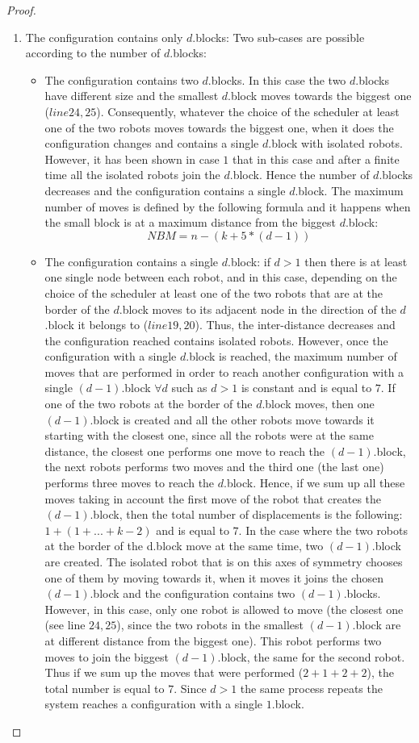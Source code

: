 \documentclass[12pt]{llncs}
\begin{document}
\begin{proof}
\begin{enumerate}
\item{The configuration contains only $d$.blocks:} Two sub-cases are possible according to the number of $d$.blocks:
\begin{itemize}
\item{The configuration contains two $d$.blocks.} In this case the two $d$.blocks have different size and the smallest $d$.block moves towards the biggest one ($line 24,25$). Consequently, whatever the choice of the scheduler at least one of the two robots moves towards the biggest one, when it does the configuration changes and contains a single $d$.block with isolated robots. However, it has been shown in case $1$ that in this case and after a finite time all the isolated robots join the $d$.block. Hence the number of $d$.blocks decreases and the configuration contains a single $d$.block. The maximum number of moves is defined by the following formula and it happens when the small block is at a maximum distance from the biggest $d$.block: \begin{equation}
    NBM= n-(k+5*(d-1))
   \label{max4}
 \end{equation}
\item{The configuration contains a single $d$.block:} if $d>1$ then there is at least one single node between each robot, and in this case, depending on the choice of the scheduler at least one of the two robots that are at the border of the $d$.block moves to its adjacent node in the direction of the $d$.block it belongs to ($line 19,20$). Thus, the inter-distance decreases and the configuration reached contains isolated robots. However, once the configuration with a single $d$.block is reached, the maximum number of moves that are performed in order to reach another configuration with a single $(d-1)$.block $\forall d$ such as $d>1$ is constant and is equal to $7$. If one of the two robots at the border of the $d$.block moves, then one $(d-1)$.block is created and all the other robots move towards it starting with the closest one, since all the robots were at the same distance, the closest one performs one move to reach the $(d-1)$.block, the next robots performs two moves and the third one (the last one) performs three moves to reach the $d$.block. Hence, if we sum up all these moves taking in account the first move of the robot that creates the $(d-1)$.block, then the total number of displacements is the following: $1+(1+...+ k-2)$ and is equal to $7$. In the case where the two robots at the border of the d.block move at the same time, two $(d-1)$.block are created. The isolated robot that is on this axes of symmetry chooses one of them by moving towards it, when it moves it joins the chosen $(d-1)$.block and the configuration contains two $(d-1)$.blocks. However, in this case, only one robot is allowed to move (the closest one (see line $24,25$), since the two robots in the smallest $(d-1)$.block are at different distance from the biggest one). This robot performs two moves to join the biggest $(d-1)$.block, the same for the second robot. Thus if we sum up the moves that were performed ($2+1+2+2$), the total number is equal to $7$. Since $d>1$ the same process repeats the system reaches a configuration with a single $1$.block. 

\end{itemize}
\end{enumerate}
\end{proof}
\end{document}

